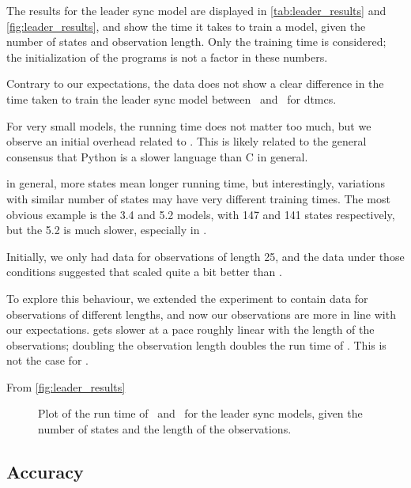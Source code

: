 The results for the leader sync model are displayed in \autoref{tab:leader_results} and \autoref{fig:leader_results}, and show the time it takes to train a model, given the number of states and observation length.
Only the training time is considered; the initialization of the programs is not a factor in these numbers.

Contrary to our expectations, the data does not show a clear difference in the time taken to train the leader sync model between \Jajapy\ and \Cupaal\ for \glspl{dtmc}.

For very small models, the running time does not matter too much, but we observe an initial overhead related to \Jajapy. This is likely related to the general consensus that Python is a slower language than C in general.

in general, more states mean longer running time, but interestingly, variations with similar number of states may have very different training times. The most obvious example is the 3.4 and 5.2 models, with 147 and 141 states respectively, but the 5.2 is much slower, especially in \Cupaal.

Initially, we only had data for observations of length 25, and the data under those conditions suggested that \Jajapy scaled quite a bit better than \Cupaal.

To explore this behaviour, we extended the experiment to contain data for observations of different lengths, and now our observations are more in line with our expectations.
\Jajapy gets slower at a pace roughly linear with the length of the observations; doubling the observation length doubles the run time of \Jajapy.
This is not the case for \Cupaal.





From \autoref{fig:leader_results}

\begin{figure*}[htb!]
    \centering
    
    \caption{Plot of the run time of \Jajapy\ and \Cupaal\ for the leader sync models, given the number of states and the length of the observations.}
    \label{fig:leader_results}
\end{figure*}


\subsection{Accuracy}\label{subsec:accuracy}
